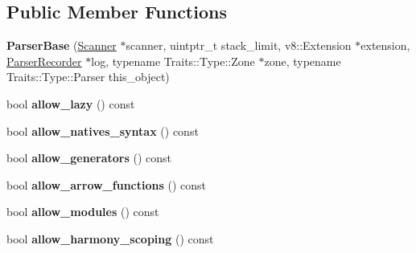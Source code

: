 \subsection*{Public Member Functions}
\begin{DoxyCompactItemize}
\item 
\hypertarget{classv8_1_1internal_1_1_parser_base_ab077364f5448a34bddb4596e4016b35c}{}{\bfseries Parser\+Base} (\hyperlink{classv8_1_1internal_1_1_scanner}{Scanner} $\ast$scanner, uintptr\+\_\+t stack\+\_\+limit, v8\+::\+Extension $\ast$extension, \hyperlink{classv8_1_1internal_1_1_parser_recorder}{Parser\+Recorder} $\ast$log, typename Traits\+::\+Type\+::\+Zone $\ast$zone, typename Traits\+::\+Type\+::\+Parser this\+\_\+object)\label{classv8_1_1internal_1_1_parser_base_ab077364f5448a34bddb4596e4016b35c}

\item 
\hypertarget{classv8_1_1internal_1_1_parser_base_a4ecc78161895cd228bb03ea56e0efd26}{}bool {\bfseries allow\+\_\+lazy} () const \label{classv8_1_1internal_1_1_parser_base_a4ecc78161895cd228bb03ea56e0efd26}

\item 
\hypertarget{classv8_1_1internal_1_1_parser_base_a013b3cc6392809edb6df090ca2df3a36}{}bool {\bfseries allow\+\_\+natives\+\_\+syntax} () const \label{classv8_1_1internal_1_1_parser_base_a013b3cc6392809edb6df090ca2df3a36}

\item 
\hypertarget{classv8_1_1internal_1_1_parser_base_a5b3eb4b7df76be1f619d3c4d0236fd5c}{}bool {\bfseries allow\+\_\+generators} () const \label{classv8_1_1internal_1_1_parser_base_a5b3eb4b7df76be1f619d3c4d0236fd5c}

\item 
\hypertarget{classv8_1_1internal_1_1_parser_base_a9e6e2084b22325d2b4a4ca88d5443760}{}bool {\bfseries allow\+\_\+arrow\+\_\+functions} () const \label{classv8_1_1internal_1_1_parser_base_a9e6e2084b22325d2b4a4ca88d5443760}

\item 
\hypertarget{classv8_1_1internal_1_1_parser_base_ab145e4b5f4148e75b1501d4c4f575372}{}bool {\bfseries allow\+\_\+modules} () const \label{classv8_1_1internal_1_1_parser_base_ab145e4b5f4148e75b1501d4c4f575372}

\item 
\hypertarget{classv8_1_1internal_1_1_parser_base_aad8a42eacefe1d7129f7aeb1b8d87992}{}bool {\bfseries allow\+\_\+harmony\+\_\+scoping} () const \label{classv8_1_1internal_1_1_parser_base_aad8a42eacefe1d7129f7aeb1b8d87992}


\end{DoxyCompactItemize}
